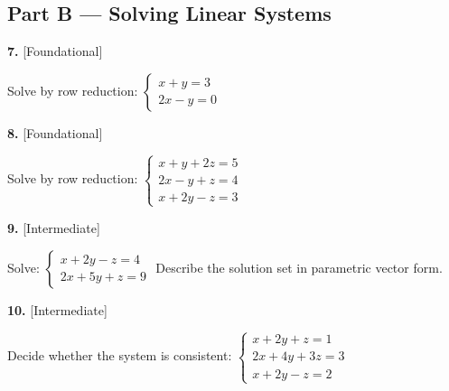 \documentclass[11pt]{article}
\begin{document}
\subsection*{\normalsize\color{ink} Part B --- Solving Linear Systems}
\begin{minipage}{\linewidth}\textbf{7.} \hfill{\scriptsize\color{ink}[Foundational]}\par\nopagebreak Solve by row reduction: $\begin{cases}x+y=3\\ 2x-y=0\end{cases}$
\vspace{3.0cm}\end{minipage}\par\vspace{4pt}
\begin{minipage}{\linewidth}\textbf{8.} \hfill{\scriptsize\color{ink}[Foundational]}\par\nopagebreak Solve by row reduction: $\begin{cases}x+y+2z=5\\ 2x-y+z=4\\ x+2y-z=3\end{cases}$
\vspace{4.1cm}\end{minipage}\par\vspace{4pt}
\begin{minipage}{\linewidth}\textbf{9.} \hfill{\scriptsize\color{ink}[Intermediate]}\par\nopagebreak Solve: $\begin{cases}x+2y-z=4\\ 2x+5y+z=9\end{cases}$ Describe the solution set in parametric vector form.
\vspace{3.8cm}\end{minipage}\par\vspace{4pt}
\begin{minipage}{\linewidth}\textbf{10.} \hfill{\scriptsize\color{ink}[Intermediate]}\par\nopagebreak Decide whether the system is consistent: $\begin{cases}x+2y+z=1\\ 2x+4y+3z=3\\ x+2y-z=2\end{cases}$
\vspace{3.9cm}\end{minipage}\par\vspace{4pt}
\end{document}
